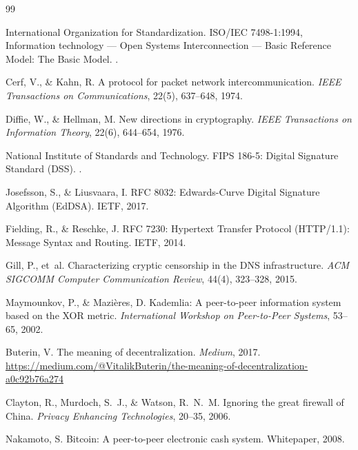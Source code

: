 \documentclass[11pt,a4paper]{article}
\begin{document}
\begin{thebibliography}{99}

International Organization for Standardization.
\newblock ISO/IEC 7498-1:1994, Information technology --- Open Systems Interconnection --- Basic Reference Model: The Basic Model.
.

Cerf, V., \& Kahn, R.
\newblock A protocol for packet network intercommunication.
\newblock \emph{IEEE Transactions on Communications}, 22(5), 637--648, 1974.

Diffie, W., \& Hellman, M.
\newblock New directions in cryptography.
\newblock \emph{IEEE Transactions on Information Theory}, 22(6), 644--654, 1976.

National Institute of Standards and Technology.
\newblock FIPS 186-5: Digital Signature Standard (DSS).
.

Josefsson, S., \& Liusvaara, I.
\newblock RFC 8032: Edwards-Curve Digital Signature Algorithm (EdDSA).
\newblock IETF, 2017.

Fielding, R., \& Reschke, J.
\newblock RFC 7230: Hypertext Transfer Protocol (HTTP/1.1): Message Syntax and Routing.
\newblock IETF, 2014.

Gill, P., et~al.
\newblock Characterizing cryptic censorship in the DNS infrastructure.
\newblock \emph{ACM SIGCOMM Computer Communication Review}, 44(4), 323--328, 2015.

Maymounkov, P., \& Mazi\`{e}res, D.
\newblock Kademlia: A peer-to-peer information system based on the XOR metric.
\newblock \emph{International Workshop on Peer-to-Peer Systems}, 53--65, 2002.

Buterin, V.
\newblock The meaning of decentralization.
\newblock \emph{Medium}, 2017.
\newblock \url{https://medium.com/@VitalikButerin/the-meaning-of-decentralization-a0c92b76a274}

Clayton, R., Murdoch, S.~J., \& Watson, R.~N.~M.
\newblock Ignoring the great firewall of China.
\newblock \emph{Privacy Enhancing Technologies}, 20--35, 2006.

Nakamoto, S.
\newblock Bitcoin: A peer-to-peer electronic cash system.
\newblock Whitepaper, 2008.


\end{thebibliography}
\end{document}
